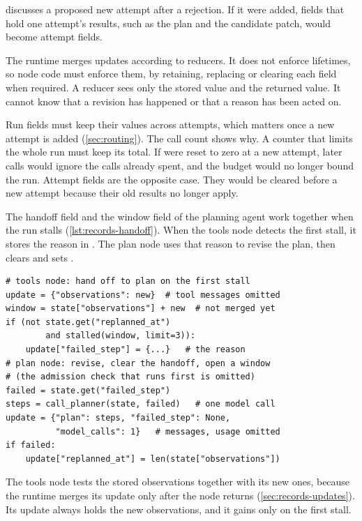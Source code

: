  discusses a proposed new attempt after a rejection. If it were added, fields that
hold one attempt's results, such as the plan and the candidate patch, would become attempt fields.

The runtime merges updates according to reducers. It does not enforce lifetimes, so node code
must enforce them, by retaining, replacing or clearing each field when required. A reducer sees
only the stored value and the returned value. It cannot know that a revision has happened or that
a reason has been acted on.

Run fields must keep their values across attempts, which matters once a new attempt is added
(\cref{sec:routing}). The call count shows why. A counter that limits the whole run must keep its
total. If  were reset to zero at a new attempt, later calls would ignore the
calls already spent, and the budget would no longer bound the run. Attempt fields are the opposite
case. They would be cleared before a new attempt because their old results no longer apply.

The handoff field and the window field of the planning agent work together when the run stalls
(\cref{lst:records-handoff}). When the tools node detects the first stall, it stores the reason in
. The plan node uses that reason to revise the plan, then clears
 and sets .

\begin{lstlisting}[float=tbp, basicstyle=\ttfamily\footnotesize, caption={Illustrative excerpts from the tools
node and the plan node: the handoff in \texttt{failed\_step} and the window in
\texttt{replanned\_at}.}, label=lst:records-handoff]
# tools node: hand off to plan on the first stall
update = {"observations": new}  # tool messages omitted
window = state["observations"] + new  # not merged yet
if (not state.get("replanned_at")
        and stalled(window, limit=3)):
    update["failed_step"] = {...}   # the reason
# plan node: revise, clear the handoff, open a window
# (the admission check that runs first is omitted)
failed = state.get("failed_step")
steps = call_planner(state, failed)   # one model call
update = {"plan": steps, "failed_step": None,
          "model_calls": 1}   # messages, usage omitted
if failed:
    update["replanned_at"] = len(state["observations"])
\end{lstlisting}

The tools node tests the stored observations together with its new ones, because the runtime merges
its update only after the node returns (\cref{sec:records-updates}). Its update always holds the new
observations, and it gains  only on the first stall.

